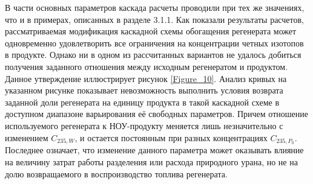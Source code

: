 В части основных параметров каскада расчеты проводили при тех же значениях, что и в примерах, описанных в разделе 3.1.1. Как показали результаты расчетов, рассматриваемая модификация каскадной схемы обогащения регенерата может одновременно удовлетворить все ограничения на концентрации четных изотопов в продукте. Однако ни в одном из рассчитанных вариантов не удалось добиться получения заданного отношения между исходным регенератом и продуктом. Данное утверждение иллюстрирует рисунок \ref{Figure_10}. Анализ кривых на указанном рисунке показывает невозможность выполнить условия возврата заданной доли регенерата на единицу продукта в такой каскадной схеме в доступном диапазоне варьирования её свободных параметров. Причем отношение используемого регенерата к НОУ-продукту меняется лишь незначительно с изменением $C_{235, W}$, и остается постоянным при разных концентрациях $C_{235, P_0}$. Последнее означает, что изменение данного параметра может оказывать влияние на величину затрат работы разделения или расхода природного урана, но не на долю возвращаемого в воспроизводство топлива регенерата.





